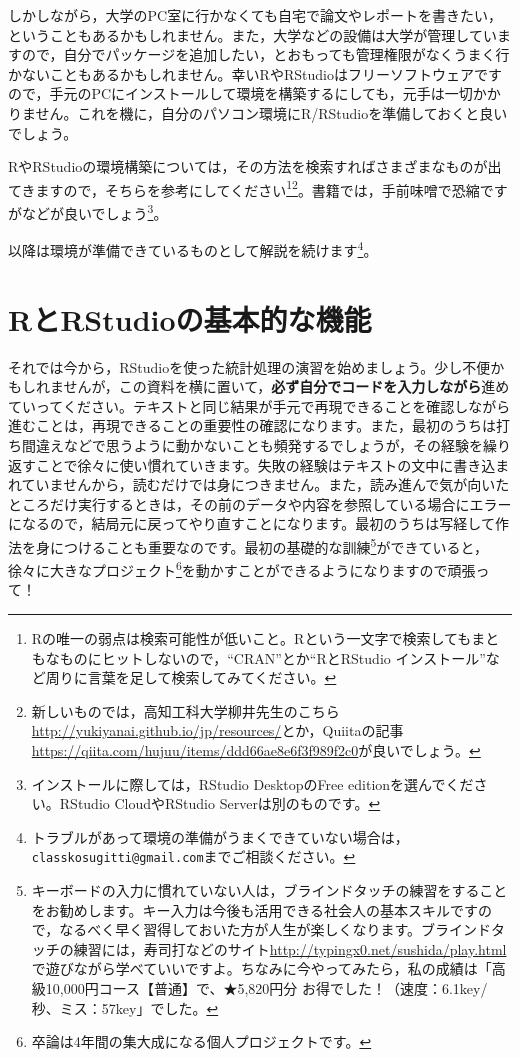 \documentclass{ltjbook}
\begin{document}
しかしながら，大学のPC室に行かなくても自宅で論文やレポートを書きたい，ということもあるかもしれません。また，大学などの設備は大学が管理していますので，自分でパッケージを追加したい，とおもっても管理権限がなくうまく行かないこともあるかもしれません。幸いRやRStudioはフリーソフトウェアですので，手元のPCにインストールして環境を構築するにしても，元手は一切かかりません。これを機に，自分のパソコン環境にR/RStudioを準備しておくと良いでしょう。

RやRStudioの環境構築については，その方法を検索すればさまざまなものが出てきますので，そちらを参考にしてください\footnote{Rの唯一の弱点は検索可能性が低いこと。Rという一文字で検索してもまともなものにヒットしないので，``CRAN''とか``RとRStudio インストール''など周りに言葉を足して検索してみてください。}\footnote{新しいものでは，高知工科大学柳井先生のこちら\url{http://yukiyanai.github.io/jp/resources/}とか，Quiitaの記事\url{https://qiita.com/hujuu/items/ddd66ae8e6f3f989f2c0}が良いでしょう。}。書籍では，手前味噌で恐縮ですが\citet{kosugi2019}などが良いでしょう\footnote{インストールに際しては，RStudio DesktopのFree editionを選んでください。RStudio CloudやRStudio Serverは別のものです。}。

以降は環境が準備できているものとして解説を続けます\footnote{トラブルがあって環境の準備がうまくできていない場合は，\texttt{classkosugitti@gmail.com}までご相談ください。}。

\section{RとRStudioの基本的な機能}
それでは今から，RStudioを使った統計処理の演習を始めましょう。少し不便かもしれませんが，この資料を横に置いて，\textbf{必ず自分でコードを入力しながら}進めていってください。テキストと同じ結果が手元で再現できることを確認しながら進むことは，再現できることの重要性の確認になります。また，最初のうちは打ち間違えなどで思うように動かないことも頻発するでしょうが，その経験を繰り返すことで徐々に使い慣れていきます。失敗の経験はテキストの文中に書き込まれていませんから，読むだけでは身につきません。また，読み進んで気が向いたところだけ実行するときは，その前のデータや内容を参照している場合にエラーになるので，結局元に戻ってやり直すことになります。最初のうちは写経して作法を身につけることも重要なのです。最初の基礎的な訓練\footnote{キーボードの入力に慣れていない人は，ブラインドタッチの練習をすることをお勧めします。キー入力は今後も活用できる社会人の基本スキルですので，なるべく早く習得しておいた方が人生が楽しくなります。ブラインドタッチの練習には，寿司打などのサイト\url{http://typingx0.net/sushida/play.html}で遊びながら学べていいですよ。ちなみに今やってみたら，私の成績は「高級10,000円コース【普通】で、★5,820円分 お得でした！（速度：6.1key/秒、ミス：57key」でした。}ができていると，徐々に大きなプロジェクト\footnote{卒論は4年間の集大成になる個人プロジェクトです。}を動かすことができるようになりますので頑張って！
\end{document}

